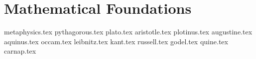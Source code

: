\part{Mathematical Foundations}

{metaphysics.tex}
{pythagorous.tex}
{plato.tex}
{aristotle.tex}
{plotinus.tex}
{augustine.tex}
{aquinus.tex}
{occam.tex}
{leibnitz.tex}
{kant.tex}
{russell.tex}
{godel.tex}
{quine.tex}
{carnap.tex}
